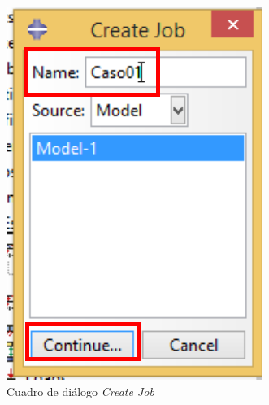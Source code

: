 \begin{figure}[!h]
\begin{subfigure}[!h]{0.32\textwidth}
      \includegraphics[width=\textwidth]{./body/images/job02.pdf}
      \caption{Cuadro de diálogo \textit{Create Job}}
      \label{job02}
    \end{subfigure}%
    ~
    \begin{subfigure}[!h]{0.44\textwidth}

\end{subfigure}
\end{figure}
